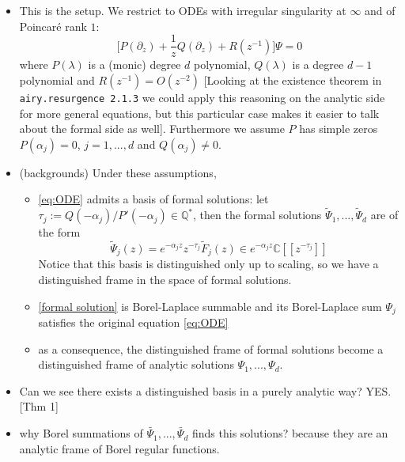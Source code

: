 \documentclass{article}
\newcommand{\C}{\mathbb{C}}
\begin{document}
\begin{itemize}
\begin{itemize}
\item This is the setup. We restrict to ODEs with irregular singularity at $\infty$ and of Poincaré rank $1$: 
\begin{equation}\label{eqn:standard ODE}
\big[ P(\partial_z)+\frac{1}{z}Q(\partial_z)+R(z^{-1})\big]\Psi=0
\end{equation}
where $P(\lambda)$ is a (monic) degree $d$ polynomial, $Q(\lambda)$ is a degree $d-1$ polynomial and $R(z^{-1})=O(z^{-2})$ [Looking at the existence theorem in {\tt airy.resurgence 2.1.3} we could apply this reasoning on the analytic side for more general equations, but this particular case makes it easier to talk about the formal side as well]. Furthermore we assume $P$ has simple zeros $P(\alpha_j)=0$, $j=1,...,d$ and $Q(\alpha_j)\neq 0$. 
\item (backgrounds) Under these assumptions, 
\begin{itemize}
\item \eqref{eq:ODE} admits a basis of formal solutions: let $\tau_j:=Q(-\alpha_j)/P'(-\alpha_j)\in\mathbb{Q}^*$, then the formal solutions $\tilde{\Psi}_1,...,\tilde{\Psi}_d$ are of the form  
\begin{equation}
\label{formal solution}
\tilde{\Psi}_j(z)=e^{-\alpha_j z}z^{-\tau_j}\tilde{F}_j(z)\in e^{-\alpha_j z }\C[\![z^{-\tau_j}]\!]
\end{equation}
Notice that this basis is distinguished only up to scaling, so we have a distinguished frame in the space of formal solutions. 
\item \eqref{formal solution} is Borel-Laplace summable and its Borel-Laplace sum $\Psi_j$ satisfies the original equation \eqref{eq:ODE}
\item as a consequence, the distinguished frame of formal solutions become a distinguished frame of analytic solutions $\Psi_1,...,\Psi_d$.  
\end{itemize}
\item Can we see there exists a distinguished basis in a purely analytic way? YES. [Thm 1]%
\item why Borel summations of $\tilde{\Psi_1},...,\tilde{\Psi_d}$ finds this solutions? because they are an analytic frame of Borel regular functions. 
\begin{itemize}

\end{itemize}
\end{itemize}
\end{itemize}
\end{document}
